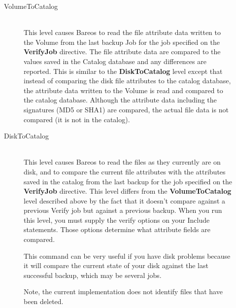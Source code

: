 \begin{description}
\begin{description}

\item [VolumeToCatalog] \hfill \\
This level causes Bareos to read the file attribute data written to the
Volume from the last backup Job for the job specified on the {\bf VerifyJob}
directive.  The file attribute data are compared to the
values saved in the Catalog database and any differences are reported.
This is similar to the {\bf DiskToCatalog} level except that instead of
comparing the disk file attributes to the catalog database, the
attribute data written to the Volume is read and compared to the catalog
database.  Although the attribute data including the signatures (MD5 or
SHA1) are compared, the actual file data is not compared (it is not in
the catalog).


\item [DiskToCatalog] \hfill \\
This level causes Bareos to read the files as they currently are on
disk, and to compare the current file attributes with the attributes
saved in the catalog from the last backup for the job specified on the
{\bf VerifyJob} directive.  This level differs from the {\bf VolumeToCatalog}
level described above by the fact that it doesn't compare against a
previous Verify job but against a previous backup.  When you run this
level, you must supply the verify options on your Include statements.
Those options determine what attribute fields are compared.

This command can be very useful if you have disk problems because it
will compare the current state of your disk against the last successful
backup, which may be several jobs.

Note, the current implementation does not identify files that
have been deleted.
\end{description}

\end{description}
